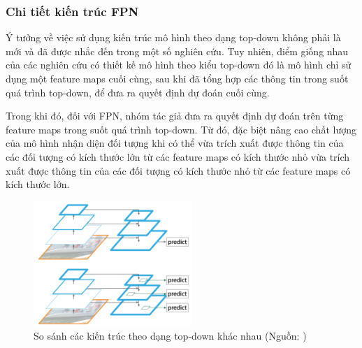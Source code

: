 {    \subsubsection*{Chi tiết kiến trúc FPN}
    Ý tưởng về việc sử dụng kiến trúc mô hình theo dạng top-down không phải là mới và đã được nhắc đến trong một số nghiên cứu. Tuy nhiên, điểm giống nhau của các nghiên cứu có thiết kế mô hình theo kiểu top-down đó là mô hình chỉ sử dụng một feature maps  cuối cùng, sau khi đã tổng hợp các thông tin trong suốt quá trình top-down, để đưa ra quyết định dự đoán cuối cùng.

    \noindent
    Trong khi đó, đối với FPN, nhóm tác giả đưa ra quyết định dự đoán trên từng feature maps  trong suốt quá trình top-down. Từ đó, đặc biệt nâng cao chất lượng của mô hình nhận diện đối tượng  khi có thể vừa trích xuất được thông tin của các đối tượng có kích thước lớn từ các feature maps  có kích thước nhỏ vừa trích xuất được thông tin của các đối tượng có kích thước nhỏ từ các feature maps  có kích thước lớn.

    \begin{figure}[H]
        \centering
        \includegraphics[width=6cm] {images/fpn_topdown}
        \caption{So sánh các kiến trúc theo dạng top-down khác nhau (Nguồn: \cite{lin2017feature})}
        \label{fig:fpn_topdown}
    \end{figure}

}
